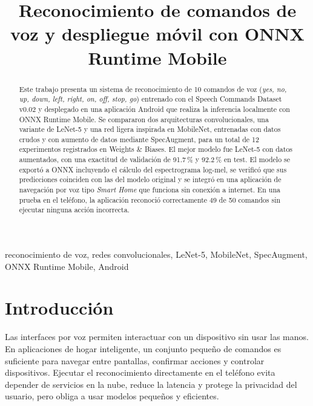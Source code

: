 \documentclass[conference]{IEEEtran}
\begin{document}
\title{Reconocimiento de comandos de voz y despliegue móvil con ONNX Runtime Mobile}

\author{
\and
{}
}

\maketitle

\begin{abstract}
Este trabajo presenta un sistema de reconocimiento de 10 comandos de voz (\textit{yes, no, up, down, left, right, on, off, stop, go}) entrenado con el Speech Commands Dataset v0.02 y desplegado en una aplicación Android que realiza la inferencia localmente con ONNX Runtime Mobile. Se compararon dos arquitecturas convolucionales, una variante de LeNet-5 y una red ligera inspirada en MobileNet, entrenadas con datos crudos y con aumento de datos mediante SpecAugment, para un total de 12 experimentos registrados en Weights \& Biases. El mejor modelo fue LeNet-5 con datos aumentados, con una exactitud de validación de 91.7\,\% y 92.2\,\% en test. El modelo se exportó a ONNX incluyendo el cálculo del espectrograma log-mel, se verificó que sus predicciones coinciden con las del modelo original y se integró en una aplicación de navegación por voz tipo \textit{Smart Home} que funciona sin conexión a internet. En una prueba en el teléfono, la aplicación reconoció correctamente 49 de 50 comandos sin ejecutar ninguna acción incorrecta.
\end{abstract}

\begin{IEEEkeywords}
reconocimiento de voz, redes convolucionales, LeNet-5, MobileNet, SpecAugment, ONNX Runtime Mobile, Android
\end{IEEEkeywords}

\section{Introducción}
Las interfaces por voz permiten interactuar con un dispositivo sin usar las manos. En aplicaciones de hogar inteligente, un conjunto pequeño de comandos es suficiente para navegar entre pantallas, confirmar acciones y controlar dispositivos. Ejecutar el reconocimiento directamente en el teléfono evita depender de servicios en la nube, reduce la latencia y protege la privacidad del usuario, pero obliga a usar modelos pequeños y eficientes.
\end{document}

